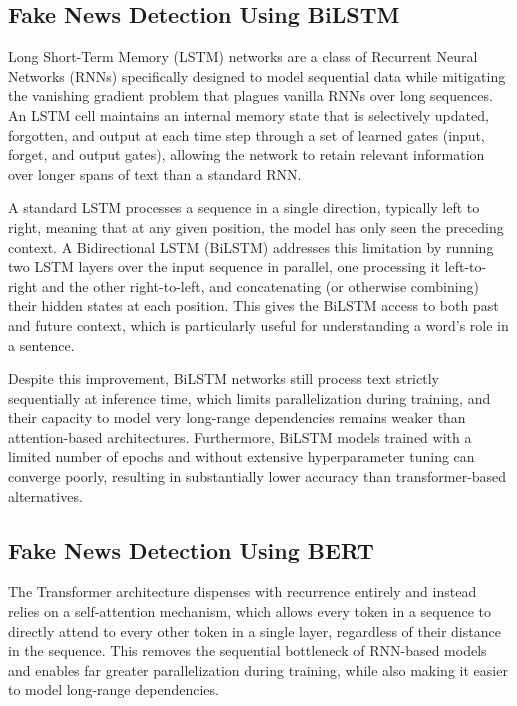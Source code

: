 \subsection{Fake News Detection Using BiLSTM}

Long Short-Term Memory (LSTM) networks are a class of Recurrent Neural Networks (RNNs) specifically designed to model sequential data while mitigating the vanishing gradient problem that plagues vanilla RNNs over long sequences. An LSTM cell maintains an internal memory state that is selectively updated, forgotten, and output at each time step through a set of learned gates (input, forget, and output gates), allowing the network to retain relevant information over longer spans of text than a standard RNN.

A standard LSTM processes a sequence in a single direction, typically left to right, meaning that at any given position, the model has only seen the preceding context. A Bidirectional LSTM (BiLSTM) addresses this limitation by running two LSTM layers over the input sequence in parallel, one processing it left-to-right and the other right-to-left, and concatenating (or otherwise combining) their hidden states at each position. This gives the BiLSTM access to both past and future context, which is particularly useful for understanding a word's role in a sentence.

Despite this improvement, BiLSTM networks still process text strictly sequentially at inference time, which limits parallelization during training, and their capacity to model very long-range dependencies remains weaker than attention-based architectures. Furthermore, BiLSTM models trained with a limited number of epochs and without extensive hyperparameter tuning can converge poorly, resulting in substantially lower accuracy than transformer-based alternatives.

\subsection{Fake News Detection Using BERT}

The Transformer architecture dispenses with recurrence entirely and instead relies on a self-attention mechanism, which allows every token in a sequence to directly attend to every other token in a single layer, regardless of their distance in the sequence. This removes the sequential bottleneck of RNN-based models and enables far greater parallelization during training, while also making it easier to model long-range dependencies.

